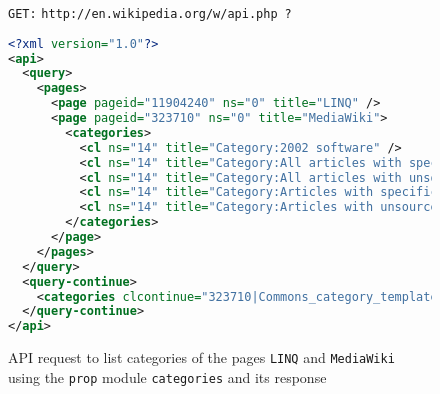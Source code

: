 \begin{figure}[p]
\texttt{GET:}
\texttt{http://en.wikipedia.org/w/api.php}~\texttt{?}

\begin{lstlisting}[language=xml]
<?xml version="1.0"?>
<api>
  <query>
    <pages>
      <page pageid="11904240" ns="0" title="LINQ" />
      <page pageid="323710" ns="0" title="MediaWiki">
        <categories>
          <cl ns="14" title="Category:2002 software" />
          <cl ns="14" title="Category:All articles with spec..." />
          <cl ns="14" title="Category:All articles with unso..." />
          <cl ns="14" title="Category:Articles with specific..." />
          <cl ns="14" title="Category:Articles with unsource..." />
        </categories>
      </page>
    </pages>
  </query>
  <query-continue>
    <categories clcontinue="323710|Commons_category_template..." />
  </query-continue>
</api>
\end{lstlisting}

\caption[API request to list categories of given pages and its response]{
API request to list categories of the pages \texttt{LINQ} and \texttt{MediaWiki} \\
using the \texttt{prop} module \texttt{categories} and its response}
\label{API categories titles example}
\end{figure}

